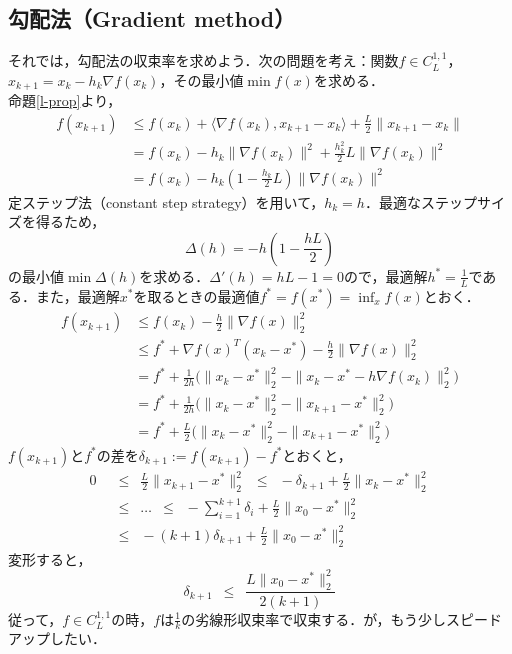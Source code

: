 \documentclass[a4paper,11pt]{jsarticle}
\numberwithin{theorem}{section}  %
\numberwithin{equation}{section} %
\begin{document}
\subsection{勾配法（Gradient method）}
それでは，勾配法の収束率を求めよう．次の問題を考え：関数$f  \in C_L^{1,1} $，$x_{k+1} = x_k - h_k \nabla f(x_k)$，その最小値$\min f(x)$を求める．\\
命題\ref{l-prop}より，
\begin{equation}
\begin{split}
f(x_{k+1}) & \le f(x_k) + \langle \nabla f(x_k), x_{k+1}-x_k \rangle + \frac{L}{2}\|  x_{k+1} - x_k \|\\
& = f(x_k) - h_k \| \nabla f(x_k) \|^2 +  \frac{h_k^2}{2}L\| \nabla f(x_k) \|^2 \\
& = f(x_k) - h_k(1- \frac{h_k}{2}L)\|  \nabla f(x_k) \|^2
\end{split}
\end{equation}
定ステップ法（constant step strategy）を用いて，$h_k = h$．最適なステップサイズを得るため，
\begin{equation}
 \Delta(h) = -h(1-\frac{hL}{2})
\end{equation}
の最小値$\min \Delta(h)$を求める．$\Delta ' (h) = hL-1=0$ので，最適解$h^*=\frac{1}{L}$である．また，最適解$x^*$を取るときの最適値$f^*=f(x^*)=\inf_x f(x)$とおく．
\begin{equation}
\begin{split}
f(x_{k+1}) & \le f(x_k) - \frac{h}{2}\| \nabla f(x) \|_2^2\\
& \le f^* + \nabla f(x)^T(x_k - x^*) - \frac{h}{2}\| \nabla f(x) \|_2^2\\
& = f^* + \frac{1}{2h}\Bigr(  \| x_k -x^* \|_2^2 - \| x_k -x^* - h \nabla f(x_k) \|_2^2  \Bigr)\\
& = f^* + \frac{1}{2h}\Bigr(  \| x_k -x^* \|_2^2 - \| x_{k+1}-x^* \|_2^2  \Bigr)\\
& = f^* + \frac{L}{2}\Bigr(  \| x_k -x^* \|_2^2 - \| x_{k+1}-x^* \|_2^2  \Bigr)
\end{split}
\end{equation}
$f(x_{k+1})$と$f^*$の差を$\delta_{k+1} := f({x_{k+1}})-f^*$とおくと，
\begin{equation}
\begin{split}
0 & \,\,\,\le\,\,\,  \frac{L}{2}\| x_{k+1}-x^* \|_2^2 \,\,\,\le\,\,\, -\delta_{k+1} + \frac{L}{2}\| x_k -x^* \|_2^2 \\
& \,\,\,\le\,\,\, \dots \,\,\,\le\,\,\, - \sum_{i=1}^{k+1} \delta_i +  \frac{L}{2}\| x_0 -x^* \|_2^2 \\
& \,\,\,\le\,\,\, -(k+1)\delta_{k+1} + \frac{L}{2}\| x_0 -x^* \|_2^2 
\end{split}
\label{roc}
\end{equation}
変形すると，
\begin{equation}
\delta_{k+1} \,\,\, \le \,\,\, \frac{L\| x_0 - x^* \|_2^2}{2(k+1)}
\end{equation}
従って，$f \in C_L^{1,1}$の時，$f$は$\frac{1}{k}$の劣線形収束率で収束する．が，もう少しスピードアップしたい．
\end{document}
